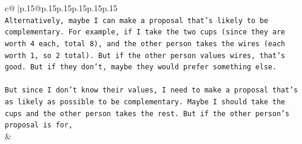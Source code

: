 \documentclass{article}
\begin{document}
{\begin{supertabular}{c@{$\;$}|p{.15\linewidth}@{}p{.15\linewidth}p{.15\linewidth}p{.15\linewidth}p{.15\linewidth}p{.15\linewidth}}
{{{\\ 
\texttt{Alternatively, maybe I can make a proposal that's likely to be complementary. For example, if I take the two cups (since they are worth 4 each, total 8), and the other person takes the wires (each worth 1, so 2 total). But if the other person values wires, that's good. But if they don't, maybe they would prefer something else.} \\
\\ 
\texttt{But since I don't know their values, I need to make a proposal that's as likely as possible to be complementary. Maybe I should take the cups and the other person takes the rest. But if the other person's proposal is for,} \\
            }
        }
    }
    & \\ \\


\end{supertabular}}
\end{document}

